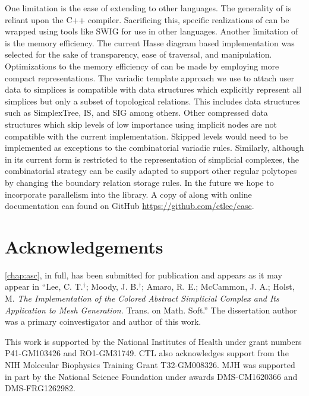 \par One limitation is the ease of extending to other languages.
The generality of \asc is reliant upon the C++ compiler.
Sacrificing this, specific realizations of \asc can be wrapped using tools like SWIG for use in other languages.
Another limitation of \asc is the memory efficiency.
The current Hasse diagram based implementation was selected for the sake of transparency, ease of traversal, and manipulation.
Optimizations to the memory efficiency of \asc can be made by employing more compact representations.
The variadic template approach we use to attach user data to simplices is compatible with data structures which explicitly represent all simplices but only a subset of topological relations.
This includes data structures such as SimplexTree\cite{Boissonnat2012}, IS\cite{DeFloriani2010b}, and SIG\cite{DeFloriani2004} among others.
Other compressed data structures which skip levels of low importance using implicit nodes are not compatible with the current \asc implementation.
Skipped levels would need to be implemented as exceptions to the combinatorial variadic rules.
Similarly, although \asc in its current form is restricted to the representation of simplicial complexes, the combinatorial strategy can be easily adapted to support other regular polytopes by changing the boundary relation storage rules.
In the future we hope to incorporate parallelism into the \asc library.
A copy of \asc along with online documentation can found on GitHub \url{https://github.com/ctlee/casc}.

\section{Acknowledgements}
\par \cref{chap:asc}, in full, has been submitted for publication and appears as it may appear in
``Lee, C. T.$^{\dagger}$; Moody, J. B.$^{\dagger}$; Amaro, R. E.; McCammon, J. A.; Holst, M. \emph{The Implementation of the Colored Abstract Simplicial Complex and Its Application to Mesh Generation.} Trans. on Math. Soft.''
The dissertation author was a primary coinvestigator and author of this work.

\par This work is supported by the National Institutes of Health under grant numbers P41-GM103426 and RO1-GM31749.
CTL also acknowledges support from the NIH Molecular Biophysics Training Grant T32-GM008326.
MJH was supported in part by the National Science Foundation under awards DMS-CM1620366 and DMS-FRG1262982.

